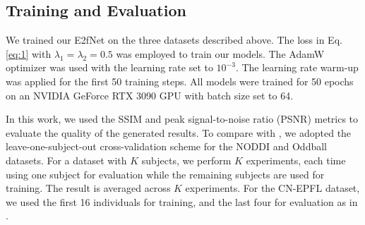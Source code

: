 \subsection{Training and Evaluation}
We trained our E2fNet on the three datasets described above. 
The loss in Eq. \ref{eq:1} with $\lambda_{1} = \lambda_{2} = 0.5$ was employed to train our models. 
The AdamW optimizer \cite{loshchilov2017adamw} was used with the learning rate set to $10^{-3}$. 
The learning rate warm-up was applied for the first 50 training steps. 
All models were trained for 50 epochs on an NVIDIA GeForce RTX 3090 GPU with batch size set to 64. 

In this work, we used the SSIM and peak signal-to-noise ratio (PSNR) metrics to evaluate the quality of the generated results. 
To compare with \cite{lanzino2024nt}, we adopted the leave-one-subject-out cross-validation scheme for the NODDI and Oddball datasets. 
For a dataset with $K$ subjects, we perform $K$ experiments, each time using one subject for evaluation while the remaining subjects are used for training. 
The result is averaged across $K$ experiments. 
For the CN-EPFL dataset, we used the first 16 individuals for training, and the last four for evaluation as in \cite{calhas2022eeg}. 
